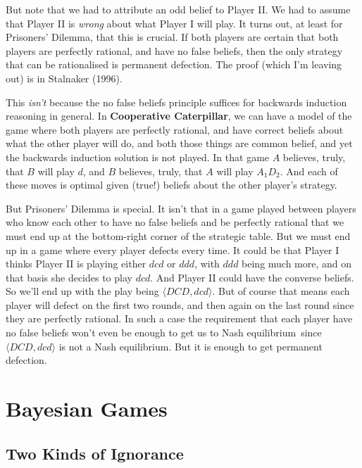 \documentclass[
  11pt,
  letterpaper,
]{scrbook}
\begin{document}
But note that we had to attribute an odd belief to Player II. We had to
assume that Player II is \emph{wrong} about what Player I will play. It
turns out, at least for Prisoners' Dilemma, that this is crucial. If
both players are certain that both players are perfectly rational, and
have no false beliefs, then the only strategy that can be rationalised
is permanent defection. The proof (which I'm leaving out) is in
Stalnaker (1996).

This \emph{isn't} because the no false beliefs principle suffices for
backwards induction reasoning in general. In \textbf{Cooperative
Caterpillar}, we can have a model of the game where both players are
perfectly rational, and have correct beliefs about what the other player
will do, and both those things are common belief, and yet the backwards
induction solution is not played. In that game \(A\) believes, truly,
that \(B\) will play \(d\), and \(B\) believes, truly, that \(A\) will
play \(A_1D_2\). And each of these moves is optimal given (true!)
beliefs about the other player's strategy.

But Prisoners' Dilemma is special. It isn't that in a game played
between players who know each other to have no false beliefs and be
perfectly rational that we must end up at the bottom-right corner of the
strategic table. But we must end up in a game where every player defects
every time. It could be that Player I thinks Player II is playing either
\(dcd\) or \(ddd\), with \(ddd\) being much more, and on that basis she
decides to play \(dcd\). And Player II could have the converse beliefs.
So we'll end up with the play being \(\langle DCD, dcd \rangle\). But of
course that means each player will defect on the first two rounds, and
then again on the last round since they are perfectly rational. In such
a case the requirement that each player have no false beliefs won't even
be enough to get us to Nash equilibrium  since
\(\langle DCD, dcd \rangle\) is not a Nash equilibrium. But it is enough
to get permanent defection.


\chapter{Bayesian Games}\label{sec-bayesian}

\section{Two Kinds of Ignorance}\label{sec-two-kinds-of-ignorance}
\end{document}
